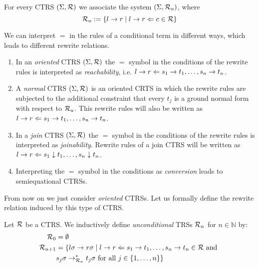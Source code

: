 \begin{definition}
    For every CTRS $(\Sigma,\mathcal{R})$ we associate the system $(\Sigma, \mathcal{R}_u)$, where
    $$\mathcal{R}_u := \{ l \rightarrow r \mid l \rightarrow r \Leftarrow c \in \mathcal{R} \} $$
\end{definition}

We can interpret $=$ in the rules of a conditional term in different ways, which leads to different rewrite relations.

\begin{definition}
    \begin{enumerate}
        \item In an \textit{oriented} CTRS $(\Sigma, \mathcal{R})$ the $=$ symbol in the conditions of the rewrite rules is interpreted as \textit{reachability}, i.e. $l \rightarrow r \Leftarrow s_1 \rightarrow t_1, \dots, s_n \rightarrow t_n$.
        \item A \textit{normal} CTRS $(\Sigma, \mathcal{R})$ is an oriented CRTS in which the rewrite rules are subjected to the additional constraint that every $t_j$ is a ground normal form with respect to $\mathcal{R}_u$. This rewrite rules will also be written as $l \rightarrow r \Leftarrow s_1 \rightarrow t_1, \dots, s_n \rightarrow t_n$.
        \item In a \textit{join} CTRS $(\Sigma, \mathcal{R})$ the $=$ symbol in the conditions of the rewrite rules is interpreted as \textit{joinability}. Rewrite rules of a join CTRS will be written as $l \rightarrow r \Leftarrow s_1 \downarrow t_1, \dots, s_n \downarrow t_n$.
        \item Interpreting the $=$ symbol in the conditions as \textit{conversion} leads to semiequational CTRSs.
    \end{enumerate}
\end{definition}

From now on we just consider \textit{oriented} CTRSs. Let us formally define the rewrite relation induced by this type of CTRS.
\begin{definition}
    Let $\mathcal{R}$ be a CTRS. We inductively define \textit{unconditional} TRSs $\mathcal{R}_n$ for $n \in \mathbb{N}$ by:
    \begin{align*}
        \mathcal{R}_0 &= \emptyset \\
        \mathcal{R}_{n+1} &= \{ l\sigma \rightarrow r\sigma \mid l \rightarrow r \Leftarrow s_1 \rightarrow t_1, \dots, s_n \rightarrow t_n \in \mathcal{R} \text{ and } \\
        &s_j\sigma \rightarrow_{\mathcal{R}_n}^* t_j \sigma \text{ for all } j \in \{ 1, \dots, n \} \}
    \end{align*}
\end{definition}

